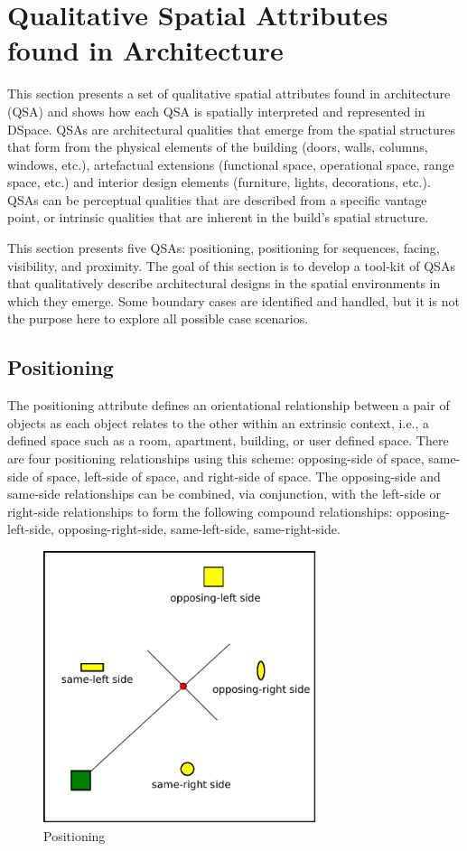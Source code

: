 \documentclass[12pt]{ucthesis}
\begin{document}
\section{Qualitative Spatial Attributes found in Architecture}
This section presents a set of qualitative spatial attributes found in architecture (QSA) and shows how each QSA is spatially interpreted and represented in DSpace. QSAs are architectural qualities that emerge from the spatial structures that form from the physical elements of the building (doors, walls, columns, windows, etc.), artefactual extensions (functional space, operational space, range space, etc.) and interior design elements (furniture, lights, decorations, etc.). QSAs can be perceptual qualities that are described from a specific vantage point, or intrinsic qualities that are inherent in the build's spatial structure. 

This section presents five QSAs: positioning, positioning for sequences, facing, visibility, and proximity. The goal of this section is to develop a tool-kit of QSAs that qualitatively describe architectural designs in the spatial environments in which they emerge. Some boundary cases are identified and handled, but it is not the purpose here to explore all possible case scenarios.

\subsection{Positioning}
The positioning attribute defines an orientational relationship between a pair of objects as each object relates to the other within an extrinsic context, i.e., a defined space such as a room, apartment, building, or user defined space. There are four positioning relationships using this scheme: opposing-side of space, same-side of space, left-side of space, and right-side of space. The opposing-side and same-side relationships can be combined, via conjunction, with the left-side or right-side relationships to form the following compound relationships: opposing-left-side, opposing-right-side, same-left-side, same-right-side.

\begin{figure}[H]
\centering
\includegraphics[width=80mm]{position}
\caption{Positioning}
\label{position}
\end{figure}
\end{document}
